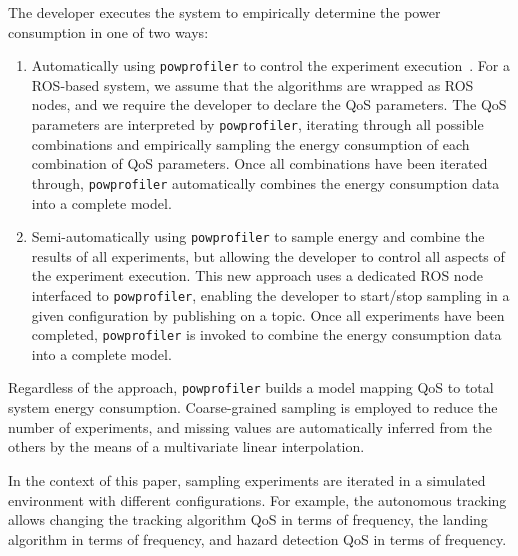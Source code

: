 \documentclass[conference]{IEEEtran}
\newcommand{\stt}[1]{{\small\tt #1}} %
\newcommand{\powprof}{\stt{powprofiler}}
\begin{document}
The developer executes the system to empirically determine the
power consumption in one of two ways:
%
\begin{enumerate}
\item Automatically using \powprof{} to control the experiment
  execution~\cite{seewald2019coarse}. For a ROS-based system, we assume that the algorithms
  are wrapped as ROS nodes, and we require the developer to declare
  the QoS parameters. %
  The QoS parameters are interpreted by
  \powprof{}, iterating through all possible
  combinations and empirically sampling the energy consumption of each
  combination of QoS parameters. Once all combinations have been
  iterated through, \powprof{} automatically combines the energy
  consumption data into a complete model.
\item Semi-automatically using \powprof{} to sample energy and combine
  the results of all experiments, but allowing the developer to
  control all aspects of the experiment execution. This new approach %
  uses a dedicated ROS node interfaced to \powprof{}, enabling
  the developer to start/stop sampling in a given
  configuration by publishing on a topic. Once all experiments have been completed, \powprof{} is
  invoked to combine the energy consumption data into
  a complete model.

\end{enumerate}
%
Regardless of the approach, \powprof{} builds a model mapping
QoS to total system energy consumption. Coarse-grained sampling is
employed to reduce the number of experiments, and missing values are
automatically inferred from the others by the means of a multivariate
linear interpolation.

In the context of this paper, sampling experiments are iterated in a
simulated environment with different configurations.  For example, the
autonomous tracking allows changing the tracking algorithm QoS in
terms of frequency, the landing algorithm in terms of frequency, and
hazard detection QoS in terms of frequency.
%



\end{document}

